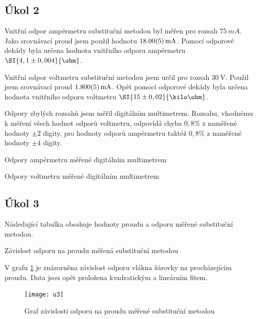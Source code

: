 \documentclass[0-protokol.tex]{subfiles}
\begin{document}
\subsection*{Úkol 2}
Vnitřní odpor ampérmetru substituční metodou byl měřen pro rozsah $\SI{75}{mA}$. Jako srovnávací proud jsem použil hodnotu $\SI{18 \pm 0,05}{mA}$. Pomocí odporové dekády byla určena hodnota vnitřního odporu ampérmetru $\SI{4,1 \pm 0,004}{\ohm}$.

Vnitřní odpor voltmetru substituční metodou jsem určil pro rozsah $\SI{30}{\volt}$. Použil jsem srovnávací proud  $\SI{1,8 \pm 0,005}{mA}$. Opět pomocí odporové dekády byla určena hodnota vnitřního odporu voltmetru $\SI{15 \pm 0,02}{\kilo\ohm}$.

Odpory zbylých rozsahů jsem měřil digitálním multimetrem. Rozsahu, vhodnému k měření všech hodnot odporů voltmetru, odpovídá chyba $0,8 \percent$  z naměřené hodnoty $\pm 2$ digity, pro hodnoty odporů ampérmetru taktéž $0,8 \percent$ z naměřené hodnoty $\pm 4$ digity. 

\begin{table}[H]
\parbox{.45\linewidth}{ \label{tab:odpory_A}
\centering
\setlength{\tabcolsep}{15pt}

\caption{Odpory ampérmetru měřené digitálním multimetrem}
\label{tab:ampermetr}
}
\hfill
\parbox{.45\linewidth}{ \label{tab:odpory_V}
\centering
\setlength{\tabcolsep}{15pt}

\caption{Odpory voltmetru měřené digitálním multimetrem}
\label{tab:voltmetr}
}
\end{table}

\newpage

\subsection*{Úkol 3}

Následující tabulka obsahuje hodnoty proudu a odporu měřené substituční metodou.

\begin{table}[H] 
\centering
\setlength{\tabcolsep}{10pt}

\caption{Závislost odporu na proudu měřená substituční metodou}
\label{tab:u3}
\end{table}

\newpage

V grafu \ref{fig:u3} je znázorněna závislost odporu vlákna žárovky na procházejícím proudu. Data jsou opět proložena kvadratickým a lineárním fitem.
\begin{figure}[H]
\centering
\texttt{[image: u3]}
\caption{Graf závislosti odporu na proudu měřené substituční metodou}
\label{fig:u3}
\end{figure}
\end{document}
